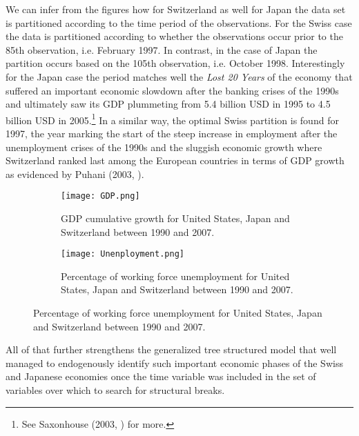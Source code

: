 We can infer from the figures how for Switzerland as well for Japan
the data set is partitioned according to the time period of the
observations. For the Swiss case the data is partitioned according to
whether the observations occur prior to the 85th observation,
i.e. February 1997. In contrast, in the case of Japan the partition
occurs based on the 105th observation, i.e. October
1998. Interestingly for the Japan case the period matches well the
\textit{Lost 20 Years} of the economy that suffered an important
economic slowdown after the banking crises of the 1990s and ultimately
saw its GDP plummeting from 5.4 billion USD in 1995 to 4.5 billion USD
in 2005.\footnote{See Saxonhouse (2003, \cite{Saxonhouse}) for more.}
In a similar way, the optimal Swiss partition is found for 1997, the
year marking the start of the steep increase in employment after the
unemployment crises of the 1990s and the sluggish economic growth
where Switzerland ranked last among the European countries in terms of
GDP growth as evidenced by Puhani (2003, \cite{Puhani}).

\begin{figure}[h!]\vspace{2mm}
  \centering
  \caption[GDP and Unemployment level]{\textit{Cumulative GDP growth
      since 1990 and Unemployment level. The dotted line represents
      the time threshold chosen by the generalized tree structured
      model to fit the parametric structural model.}}
  \label{fig:macro}
  \begin{subfigure}[b]{0.4\linewidth} \label{subfig:gdp}
    \texttt{[image: GDP.png]}
    \caption{GDP cumulative growth for United States, Japan and
      Switzerland between 1990 and 2007.\\}
  \end{subfigure} \hspace{15mm} 
  \begin{subfigure}[b]{0.4\linewidth} \label{subfig:un}
    \texttt{[image: Unenployment.png]}
    \caption{Percentage of working force unemployment for United States, Japan and
      Switzerland between 1990 and 2007.}
  \end{subfigure}
\vspace{2mm}\end{figure}

All of that further strengthens the generalized tree structured model
that well managed to endogenously identify such important economic
phases of the Swiss and Japanese economies once the time variable was
included in the set of variables over which to search for structural
breaks.

